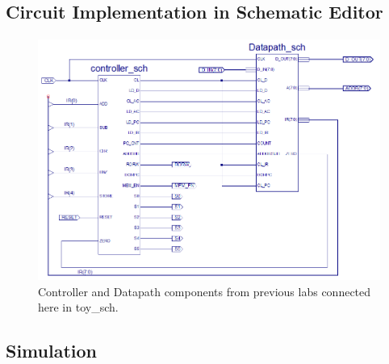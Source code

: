 \documentclass[12pt]{article}
\begin{document}
		

	\subsection{Circuit Implementation in Schematic Editor}
		\paragraph*{}
			
		\begin{figure}[h]
			\includegraphics[scale=.6]{toy_sch.PNG}
			\caption{Controller and Datapath components from previous labs connected here in toy\_sch.}
		\end{figure}
		
		\newpage
	\subsection{Simulation}
		
\end{document}
